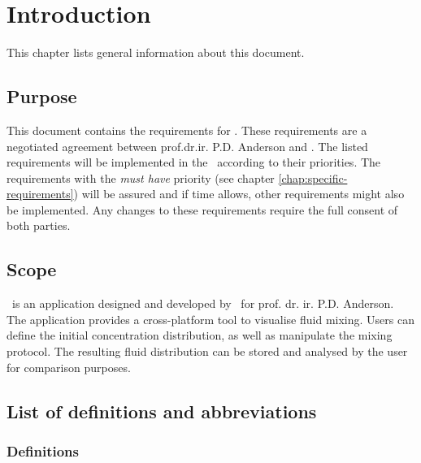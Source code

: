 \chapter{Introduction}
This chapter lists general information about this document.

\section{Purpose}
This document contains the requirements for \projectname. These requirements are a negotiated agreement between prof.dr.ir. P.D. Anderson and \projectauthor. The listed requirements will be implemented in the \applicationname\ according to their priorities. The requirements with the \emph{must have} priority (see chapter \ref{chap:specific-requirements}) will be assured and if time allows, other requirements might also be implemented. Any changes to these requirements require the full consent of both parties.

\section{Scope}
\projectname\ is an application designed and developed by \projectauthor\ for prof. dr. ir. P.D. Anderson. The application provides a cross-platform tool to visualise fluid mixing. Users can define the initial concentration distribution, as well as manipulate the mixing protocol. The resulting fluid distribution can be stored and analysed by the user for comparison purposes. \\


\section{List of definitions and abbreviations}
\subsection{Definitions}

